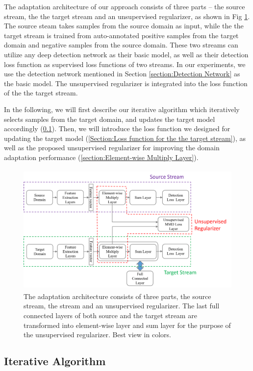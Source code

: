 \documentclass[runningheads]{llncs}
\begin{document}
The adaptation architecture of our approach consists of three parts -- the source stream, the the target stream and an unsupervised regularizer, as shown in Fig \ref{fig:streams}. The source steam takes samples from the source domain as input, while the the target stream is trained from auto-annotated positive samples from the target domain and negative samples from the source domain. These two streams can utilize any deep detection network as their basic model, as well as their detection loss function as supervised loss functions of two streams. In our experiments, we use the detection network mentioned in Section \ref{section:Detection Network} as the basic model. The unsupervised regularizer is integrated into the loss function of the the target stream.

In the following, we will first describe our iterative algorithm which iteratively selects samples from the target domain, and updates the target model accordingly (\ref{Section:Iterative Algorithm}). Then, we will introduce the loss function we designed for updating the target model (\ref{Section:Loss function for the the target stream}), as well as the proposed unsupervised regularizer for improving the domain adaptation performance (\ref{section:Element-wise Multiply Layer}).


\begin{figure}
\centering
\includegraphics[height=6.5cm]{images/streams.png}
\caption{The adaptation architecture consists of three parts, the source stream, the stream and an unsupervised regularizer. The last full connected layers of both source and the target stream are transformed into element-wise layer and sum layer for the purpose of the unsupervised regularizer. Best view in colors.}
\label{fig:streams}
\end{figure}

\subsection{Iterative Algorithm}
\label{Section:Iterative Algorithm}
\end{document}
